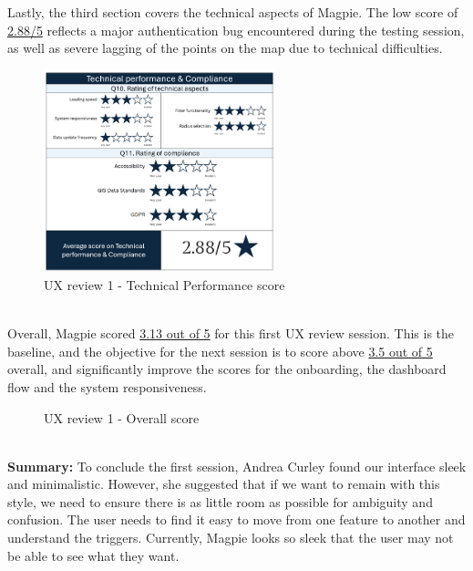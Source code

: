 \newpage
\noindent Lastly, the third section covers the technical aspects of Magpie. The low score of \underline{2.88/5} reflects a major authentication bug encountered during the testing session, as well as severe lagging of the points on the map due to technical difficulties.
\begin{figure}[h!]
    \centering
    \includegraphics[width=0.6\textwidth]{images/ux-survey1-technical.png}
    \caption{UX review 1 - Technical Performance score}
\end{figure}\\
\noindent Overall, Magpie scored \underline{3.13 out of 5} for this first UX review session. This is the baseline, and the objective for the next session is to score above \underline{3.5 out of 5} overall, and significantly improve the scores for the onboarding, the dashboard flow and the system responsiveness.
\begin{figure}[h!]
    \centering
    \caption{UX review 1 - Overall score}
\end{figure}\\
\textbf{Summary: }
To conclude the first session, Andrea Curley found our interface sleek and minimalistic. However, she suggested that if we want to remain with this style, we need to ensure there is as little room as possible for ambiguity and confusion. The user needs to find it easy to move from one feature to another and understand the triggers. Currently, Magpie looks so sleek that the user may not be able to see what they want.

